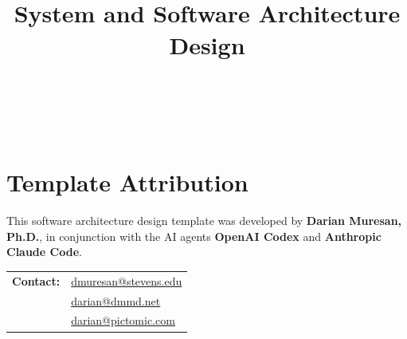 \title{\ProjectName\\[0.5em]\large System and Software Architecture Design\\[1.5em]\normalsize\VERSION\\\DocumentStatus}
\author{\DocumentOwner\\\Organization}
\conferraldate{}{\DocumentDate}
\copyrightholder{\Organization}
\maketitle

\makecopyright

\cleardoublepage
{}
\chapter*{Template Attribution}

This software architecture design template was developed by
\textbf{Darian Muresan, Ph.D.}, in conjunction with the AI agents
\textbf{OpenAI Codex} and \textbf{Anthropic Claude Code}.

\begin{tabularx}{\linewidth}{@{}L{3.0cm}Y@{}}
\textbf{Contact:} & \href{mailto:dmuresan@stevens.edu}{dmuresan@stevens.edu}\\
& \href{mailto:darian@dmmd.net}{darian@dmmd.net}\\
& \href{mailto:darian@pictomic.com}{darian@pictomic.com}
\end{tabularx}

\clearpage
\begin{abstract}
  
\end{abstract}



\contentspage
\tablelistpage
\figurelistpage
